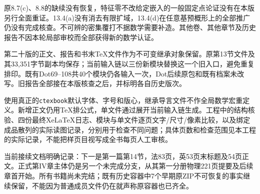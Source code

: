 原8.7(c)、8.8的缺续没有恢复，特征零不改给定嵌入的一般固定点论证没有在本版另行全面重证。13.4(a)没有消去有限扩域，13.4(d)在任意基预概形上的全部推广仍没有完成核查。不可辨的密集覆打不据数学需要补造。其他卷、其他章节及历史报告不因本轮局部审校而全部获得新的数学认证。

第二十版的正文、报告和书末TeX文件作为不可变继承对象保留。原第13节文件及其33,351字节副本均保存；当前输入链以三份新模块替换这一个旧入口，避免重复排印。既有Dot69--108共40个模块仍各输入一次，Dot后续原包和既有档案未改写。旧报告全部接在本版核查之后，并标明各自历史版次。

使用真正的\texttt{ctexbook}默认字体、字号和版心，继承导言文件不作全局数学宏重定义。新增正文仍用TeX排公式，单文件通过展开当前输入链生成。工程中的结构核验、四份最终XeLaTeX日志、模块与单文件逐页文字/尺寸/像素比较，以及绑定成品散列的实际读图记录，分别用于检查不同问题；具体页数和检查范围见本工程的实际记录，不能把样页目视写成全书每页人工审核。

当前接续文档明确记录：下一是第一篇第14节，法83页，英53页末标题及54页正文。正式第IV章主体仍是另一个未完成分支，从其第一分册物理221页提要及后续章首开始。所有书籍尚未完结；既有历史容器中7个早期原ZIP不可恢复的事实继续保留，不能因为普通成员文件仍在就声称原容器也已齐全。
